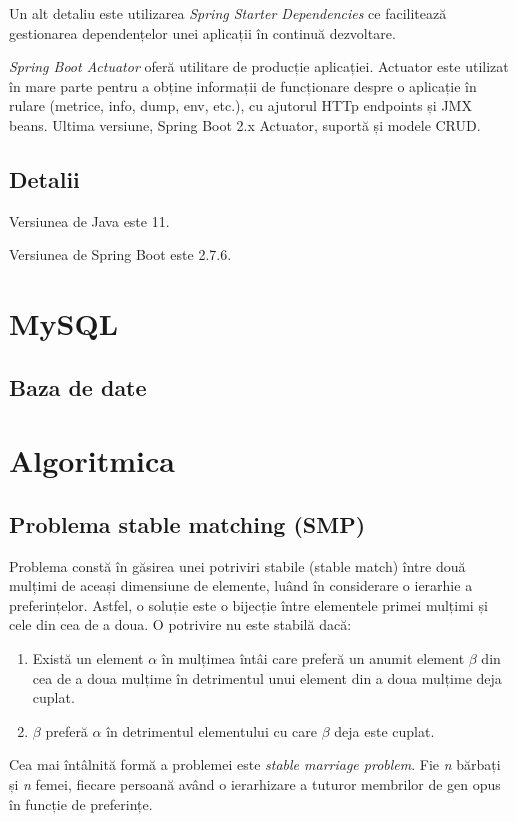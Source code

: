 Un alt detaliu este utilizarea \textit{Spring Starter Dependencies} ce facilitează gestionarea dependențelor unei aplicații în continuă dezvoltare.

\textit{Spring Boot Actuator} oferă utilitare de producție aplicației. Actuator este utilizat în mare parte pentru a obține informații de funcționare despre o aplicație în rulare (metrice, info, dump, env, etc.), cu ajutorul HTTp endpoints și JMX beans.
Ultima versiune, Spring Boot 2.x Actuator, suportă și modele CRUD.

\subsection{Detalii}
Versiunea de Java este 11.

Versiunea de Spring Boot este 2.7.6.

\section{MySQL}
\subsection{Baza de date}

\section{Algoritmica}
\subsection{Problema stable matching (SMP)}
Problema constă în găsirea unei potriviri stabile (stable match) între două mulțimi de aceași dimensiune de elemente, luând în considerare o ierarhie a preferințelor. Astfel, o soluție este o bijecție între elementele primei mulțimi și cele din cea de a doua. O potrivire nu este stabilă dacă:

\begin{enumerate}
	\item Există un element $\alpha$ în mulțimea întâi care preferă un anumit element $\beta$ din cea de a doua mulțime în detrimentul unui element din a doua mulțime deja cuplat.
	\item $\beta$ preferă $\alpha$ în detrimentul elementului cu care $\beta$ deja este cuplat.
\end{enumerate}

Cea mai întâlnită formă a problemei este \textit{stable marriage problem}. Fie \textit{n} bărbați și \textit{n} femei, fiecare persoană având o ierarhizare a tuturor membrilor de gen opus în funcție de preferințe. 

